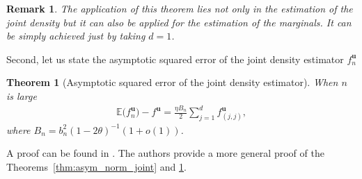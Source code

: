 \documentclass[12pt]{article}
\newtheorem{theorem}{Theorem}
\newtheorem{remark}{Remark}
\begin{document}
	\begin{remark}
		The application of this theorem lies not only in the estimation of the joint density but it can also be applied for the estimation of the marginals. It can be simply achieved just by taking $ d=1 $.
	\end{remark}
	
	Second, let us state the asymptotic squared error of the joint density estimator $ f^{\mathbf{u}}_n $ 
	
	\begin{theorem}[Asymptotic squared error of the joint density estimator]\label{thm:asym_squared_error}
		When $ n $ is large
		\begin{align}
		\mathbb{E}\big(f^{\mathbf{u}}_n\big) - f^{\mathbf{u}} = \frac{\eta B_n}{2} \sum_{j=1}^{d}f^{\mathbf{u}}_{(j, j)}, 
		\end{align}
		where $ B_n = b^2_n(1-2\theta)^{-1}(1+o(1)) $.
	\end{theorem}
	
	A proof can be found in \textcite{Camirand}. The authors provide a more general proof of the Theorems~\ref{thm:asym_norm_joint} and \ref{thm:asym_squared_error}.
	
\end{document}
